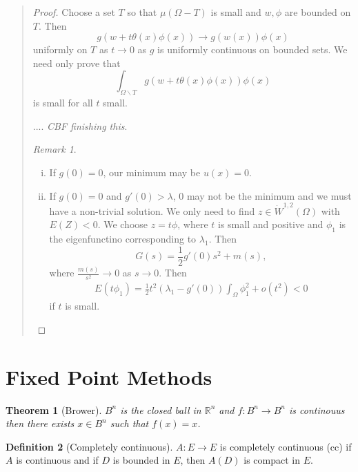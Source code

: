 \documentclass[10pt, oneside, reqno]{amsart}
\theoremstyle{plain}%
\newtheorem{thm}{Theorem}[section]
\numberwithin{equation}{section}
\theoremstyle{definition}
\newtheorem{defn}[thm]{Definition}
\theoremstyle{remark}
\newtheorem*{rem}{Remark}
\newcommand{\R}{\mathbb{R}}
\begin{document}
\begin{quote}
\begin{proof}
    Choose a set $T$ so that $\mu(\Omega - T)$ is small and $w, \phi$ are bounded on $T$. Then \[
        g(w + t \theta(x) \phi(x)) \rightarrow g(w(x)) \phi(x)
    \] uniformly on $T$ as $t \rightarrow 0$ as $g$ is uniformly continuous on bounded sets.  We need only prove that \[
        \int_{\Omega \backslash T} g(w + t \theta(x) \phi(x)) \phi(x)
    \] is small for all $t$ small.  
    
    .... \emph{CBF finishing this}.
    
    \begin{rem}{\ }
        \begin{enumerate}[(i)]
            \item If $g(0) = 0$, our minimum may be $u(x) = 0$.  
            \item If $g(0) = 0$ and $g'(0) > \lambda$, $0$ may not be the minimum and we must have a non-trivial solution.  We only need to find $z \in \dot W^{1, 2}(\Omega)$ with $E(Z) < 0$.  We choose $z = t \phi$, where $t$ is small and positive and $\phi_1$ is the eigenfunctino corresponding to $\lambda_1$.  Then \[
                G(s) = \frac{1}{2} g'(0) s^2 + m(s),
            \] where $\frac{m(s)}{s^2} \rightarrow 0$ as $s \rightarrow 0$.  Then \begin{align*}
            E(t \phi_1) = \frac{1}{2} t^2 \left( \lambda_1 - g'(0) \right) \int_\Omega \phi_1^2 + o(t^2)  < 0   
            \end{align*} if $t$ is small.
        \end{enumerate}
    \end{rem}
\end{proof}  


\end{quote}


\section{Fixed Point Methods} %
\label{sec:fixed_point_methods}
\begin{thm}[Brower]
    $B^n$ is the closed ball in $\R^n$ and $f: B^n \rightarrow B^n$ is continouus then there exists $x \in B^n$ such that $f(x) = x$.  
\end{thm}


\begin{defn}[Completely continuous]
    $A: E \rightarrow E$ is completely continuous (cc) if $A$ is continuous and if $D$ is bounded in $E$, then $A(D)$ is compact in $E$.  
\end{defn}
\end{document}
